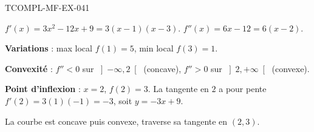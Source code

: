 \begin{corrige}{TCOMPL-MF-EX-041}

$f'(x) = 3x^2 - 12x + 9 = 3(x-1)(x-3)$. $f''(x) = 6x - 12 = 6(x-2)$.


\textbf{Variations} : max local $f(1)=5$, min local $f(3)=1$.

\textbf{Convexité} : $f''<0$ sur $\left]-\infty,2\right[$ (concave), $f''>0$ sur $\left]2,+\infty\right[$ (convexe).

\textbf{Point d'inflexion} : $x=2$, $f(2)=3$. La tangente en $2$ a pour pente $f'(2) = 3(1)(-1) = -3$, soit $y = -3x+9$.

La courbe est concave puis convexe, traverse sa tangente en $(2,3)$.

\end{corrige}
